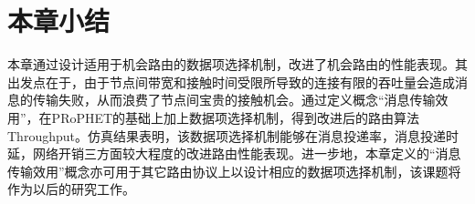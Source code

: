\section{本章小结}
\label{chap4:本章小结}


本章通过设计适用于机会路由的数据项选择机制，改进了机会路由的性能表现。其出发点在于，由于节点间带宽和接触时间受限所导致的连接有限的吞吐量会造成消息的传输失败，从而浪费了节点间宝贵的接触机会。通过定义概念“消息传输效用”，在PRoPHET的基础上加上数据项选择机制，得到改进后的路由算法Throughput。仿真结果表明，该数据项选择机制能够在消息投递率，消息投递时延，网络开销三方面较大程度的改进路由性能表现。进一步地，本章定义的“消息传输效用”概念亦可用于其它路由协议上以设计相应的数据项选择机制，该课题将作为以后的研究工作。


